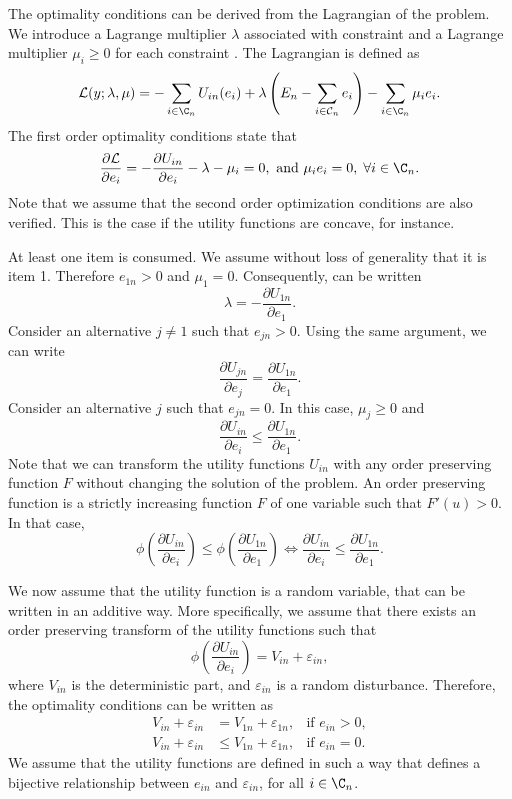 \documentclass[12pt,a4paper]{article}
\renewcommand{\L}{\mathcal{L}}
\begin{document}
The optimality conditions can be derived from the Lagrangian of the problem. We introduce a Lagrange multiplier $\lambda$ associated with constraint  and a Lagrange multiplier $\mu_i \geq 0$ for each constraint . The Lagrangian is defined as
\begin{equation}
  \L(y;\lambda, \mu) = -\sum_{i \in \C_n} U_{in}(e_i) + \lambda\left(E_n -  \sum_{i \in \mathcal{C}_n} e_{i}\right) - \sum_{i \in \C_n} \mu_i e_i.
\end{equation}
The first order optimality conditions state that
\begin{equation}
  \label{eq:optimality}
\frac{\partial \L}{\partial e_i} = - \frac{\partial U_{in}}{\partial e_i} - \lambda - \mu_i  = 0, \text{ and } \mu_i e_i = 0, \; \forall i \in \C_n.
\end{equation}
Note that we assume that the second order optimization conditions are also verified. This is the case if the utility functions are concave, for instance.

At least one item is consumed. We assume without loss of generality that it is item 1. Therefore $e_{1n} > 0$ and $\mu_1=0$. Consequently,  can be written
\[
\lambda = - \frac{\partial U_{1n}}{\partial e_1}.
\]
Consider an alternative $j\neq 1$ such that $e_{jn} > 0$. Using the same argument, we can write
\[
\frac{\partial U_{jn}}{\partial e_j} = \frac{\partial U_{1n}}{\partial e_1}.
\]
Consider an alternative $j$ such that $e_{jn} = 0$. In this case, $\mu_j \geq 0$ and
\[
\frac{\partial U_{in}}{\partial e_i}  \leq \frac{\partial U_{1n}}{\partial e_1}.
\]
Note that we can transform the utility functions $U_{in}$ with any order preserving function $F$ without changing the solution of the problem. An order preserving function is a strictly increasing function $F$ of one variable such that $F'(u) > 0$. In that case,
\[
\phi\left(\frac{\partial U_{in}}{\partial e_i}\right) \leq \phi\left(\frac{\partial U_{1n}}{\partial e_1}\right) \Longleftrightarrow
\frac{\partial U_{in}}{\partial e_i}  \leq \frac{\partial U_{1n}}{\partial e_1}.
\]

We now assume that the utility function is a random variable, that can be written in an additive way. More specifically, we assume that there exists an order preserving transform of the utility functions such that
\begin{equation}
\phi\left(\frac{\partial U_{in}}{\partial e_i}\right) = V_{in} + \varepsilon_{in},
\end{equation}
where $V_{in}$ is the deterministic part, and $\varepsilon_{in}$ is a random disturbance. Therefore, the optimality conditions can be written as
\begin{align}
V_{in} + \varepsilon_{in}  &= V_{1n} + \varepsilon_{1n},  & \text{if } e_{in} > 0, \label{eq:non_zero}\\
V_{in} + \varepsilon_{in}  &\leq V_{1n} + \varepsilon_{1n},  & \text{if } e_{in} = 0. \label{eq:zero}
\end{align}
We assume that the utility functions are defined in such a way that
 defines a bijective relationship between $e_{in}$ and
$\varepsilon_{in}$, for all $i\in\C_n$.
\end{document}
